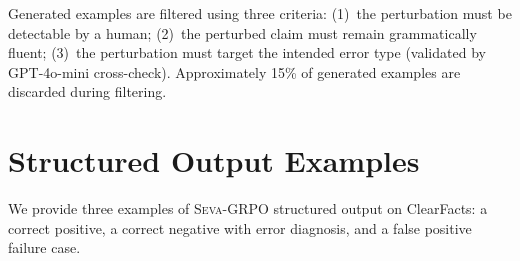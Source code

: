 \documentclass{article}
\newcommand{\seva}{\textsc{Seva}\xspace}
\begin{document}
Generated examples are filtered using three criteria:
(1)~the perturbation must be detectable by a human;
(2)~the perturbed claim must remain grammatically fluent;
(3)~the perturbation must target the intended error type (validated by GPT-4o-mini cross-check).
Approximately 15\% of generated examples are discarded during filtering.


\section{Structured Output Examples}
\label{app:example}

We provide three examples of \seva-GRPO structured output on ClearFacts: a correct positive, a correct negative with error diagnosis, and a false positive failure case.
\end{document}
